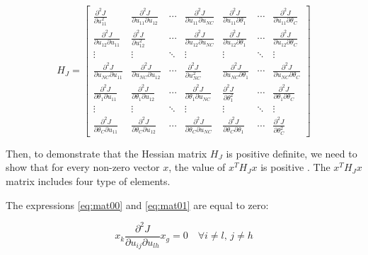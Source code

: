 \documentclass{article}
\begin{document}
\begin{equation}
H_J = \begin{bmatrix}
\frac{\partial^2 J}{\partial u_{11}^2} & \frac{\partial^2 J}{\partial u_{11} \partial u_{12}} & \cdots & \frac{\partial^2 J}{\partial u_{11} \partial u_{NC}} & \frac{\partial^2 J}{\partial u_{11} \partial \theta_1} & \cdots & \frac{\partial^2 J}{\partial u_{11} \partial \theta_C} \\
\frac{\partial^2 J}{\partial u_{12} \partial u_{11}} & \frac{\partial^2 J}{\partial u_{12}^2} & \cdots & \frac{\partial^2 J}{\partial u_{12} \partial u_{NC}} & \frac{\partial^2 J}{\partial u_{12} \partial \theta_1} & \cdots & \frac{\partial^2 J}{\partial u_{12} \partial \theta_C} \\
\vdots & \vdots & \ddots & \vdots & \vdots & \ddots & \vdots \\
\frac{\partial^2 J}{\partial u_{NC} \partial u_{11}} & \frac{\partial^2 J}{\partial u_{NC} \partial u_{12}} & \cdots & \frac{\partial^2 J}{\partial u_{NC}^2} & \frac{\partial^2 J}{\partial u_{NC} \partial \theta_1} & \cdots & \frac{\partial^2 J}{\partial u_{NC} \partial \theta_C} \\
\frac{\partial^2 J}{\partial \theta_1 \partial u_{11}} & \frac{\partial^2 J}{\partial \theta_1 \partial u_{12}} & \cdots & \frac{\partial^2 J}{\partial \theta_1 \partial u_{NC}} & \frac{\partial^2 J}{\partial \theta_1^2} & \cdots & \frac{\partial^2 J}{\partial \theta_1 \partial \theta_C} \\
\vdots & \vdots & \ddots & \vdots & \vdots & \ddots & \vdots \\
\frac{\partial^2 J}{\partial \theta_C \partial u_{11}} & \frac{\partial^2 J}{\partial \theta_C \partial u_{12}} & \cdots & \frac{\partial^2 J}{\partial \theta_C \partial u_{NC}} & \frac{\partial^2 J}{\partial \theta_C \partial \theta_1} & \cdots & \frac{\partial^2 J}{\partial \theta_C^2}
\end {bmatrix}
\end{equation}

Then, to demonstrate that the Hessian matrix $H_J$ is positive definite, we need to show that for every non-zero vector $x$, the value of $x^TH_Jx$ is positive \cite{bhatia2009positive}. 
The $x^TH_Jx$ matrix includes four type of elements. 

The expressions \ref{eq:mat00} and \ref{eq:mat01} are equal to zero:

\begin{equation}\label{eq:mat00}
x_k \frac{\partial^2 J}{\partial u_{ij} \partial u_{lh}} x_g = 0 \quad \forall i \ne l, \, j \ne h 
\end{equation}
\end{document}
